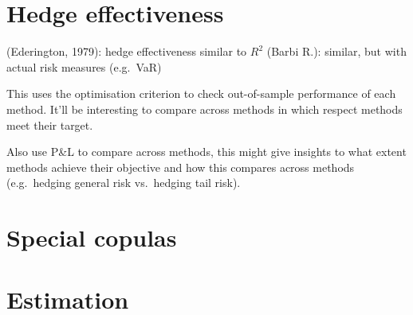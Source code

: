 \documentclass[square]{article} %
\theoremstyle{plain}
\theoremstyle{definition} %
\begin{document}
\section{Hedge effectiveness}
\label{sec:hedge-effectiveness}

(Ederington, 1979): hedge effectiveness similar to $R^2$
(Barbi R.): similar, but with actual risk measures (e.g.\ VaR)

This uses the optimisation criterion to check out-of-sample
performance of each method. It'll be interesting to compare across
methods in which respect methods meet their target.

Also use P\&L to compare across methods, this might give insights to
what extent methods achieve their objective and how this compares
across methods (e.g.\ hedging general risk vs.\ hedging tail risk). 




\section{Special copulas}
\label{sec:dependence}


\newpage
\section{Estimation}



\newpage
\end{document}
